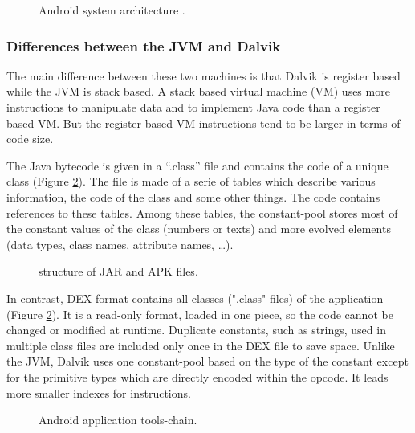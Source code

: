 \documentclass{sig-alternate}
\def \DALVIK{Dalvik\xspace}
\def \ANDROID{Android\xspace}
\def \JVM{JVM\xspace}
\def \DEX{DEX\xspace}
\begin{document}
    \begin{figure}[!h]
      \centering \resizebox{\linewidth}{!}{}
      \caption{\ANDROID system architecture \cite{wiki-android}.}
      \label{ASA}
    \end{figure}

    \subsubsection{Differences between the JVM and \DALVIK}

      The main difference between these two machines is that \DALVIK is register based while the \JVM is stack based.
      A stack based virtual machine (VM) uses more instructions to manipulate data and to implement Java code than a register based VM.
      But the register based VM instructions tend to be larger in terms of code size\cite{ieee-paul-kundu-energy-perspective}.

      The Java bytecode is given in a ``.class'' file and contains the code of a unique class (Figure \ref{SJA}).
      The file is made of a serie of tables which describe various information, the code of the class and some other things.
      The code contains references to these tables.
      Among these tables, the constant-pool stores most of the constant values of the class (numbers or texts)
      and more evolved elements (data types, class names, attribute names, \dots).

      \begin{figure}[!h]
        \centering \resizebox{\linewidth}{!}{}
        \caption{structure of JAR and APK files.}\vspace{-1em}
        \label{SJA}
      \end{figure}

      In contrast, \DEX format contains all classes (".class" files) of the application (Figure \ref{SJA}).
      It is a read-only format, loaded in one piece, so the code cannot be changed or modified at runtime.
      Duplicate constants, such as strings, used in multiple class files
      are included only once in the \DEX file to save space.
      Unlike the \JVM, \DALVIK uses one constant-pool based on the type of the constant
      except for the primitive types which are directly encoded within the opcode.
      It leads more smaller indexes for instructions.\\

      \begin{figure}[!h]
        \centering \resizebox{\linewidth}{!}{}
        \caption{\ANDROID application tools-chain.}
        \label{DTC}
      \end{figure}
\end{document}

